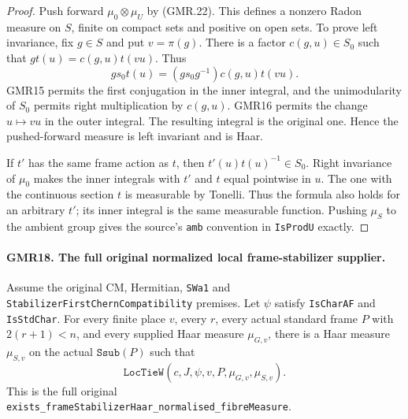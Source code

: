 \begin{proof}
Push forward $\mu_0\otimes\mu_U$ by (GMR.22).  This defines a
nonzero Radon measure on $S$, finite on compact sets and positive on
open sets.  To prove left invariance, fix $g\in S$ and put
$v=\pi(g)$.  There is a factor $c(g,u)\in S_0$ such that
$g t(u)=c(g,u)t(vu)$.  Thus
\[
 g s_0 t(u)=(g s_0 g^{-1})c(g,u)t(vu).
\]
GMR15 permits the first conjugation in the inner integral, and the
unimodularity of $S_0$ permits right multiplication by $c(g,u)$.
GMR16 permits the change $u\mapsto vu$ in the outer integral.
The resulting integral is the original one.  Hence the pushed-forward
measure is left invariant and is Haar.

If $t'$ has the same frame action as $t$, then
$t'(u)t(u)^{-1}\in S_0$.  Right invariance of $\mu_0$ makes the inner
integrals with $t'$ and $t$ equal pointwise in $u$.  The one with the
continuous section $t$ is measurable by Tonelli.  Thus the formula
also holds for an arbitrary $t'$; its inner integral is the same
measurable function.  Pushing $\mu_S$ to the ambient group gives
the source's \texttt{amb} convention in \texttt{IsProdU} exactly.
\end{proof}

\paragraph{GMR18. The full original normalized local frame-stabilizer supplier.}
\label{claim:GMR18}
Assume the original CM, Hermitian, \texttt{SWa1} and
\texttt{StabilizerFirstChernCompatibility} premises.  Let $\psi$
satisfy \texttt{IsCharAF} and \texttt{IsStdChar}.  For every finite
place $v$, every $r$, every actual standard frame $P$ with
$2(r+1)<n$, and every supplied Haar measure $\mu_{G,v}$, there is a
Haar measure $\mu_{S,v}$ on the actual $\texttt{Ssub}(P)$ such that
\[
 \texttt{LocTieW}(c,J,\psi,v,P,\mu_{G,v},\mu_{S,v}).
 \tag{GMR.26}
\]
This is the full original
\texttt{exists\_frameStabilizerHaar\_normalised\_fibreMeasure}.

